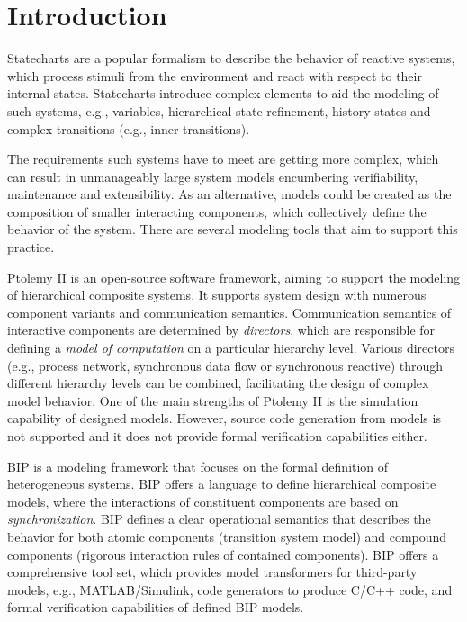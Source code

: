 \documentclass[conference]{IEEEtran}
\newcommand{\Yakindu}{\textsf{Yakindu}}
\begin{document}
\section{Introduction}

Statecharts \cite{Harel:1987:SVF:34884.34886} are a popular formalism to describe the behavior of reactive systems, which process stimuli from the environment and react with respect to their internal states. Statecharts introduce complex elements to aid the modeling of such systems, e.g., variables, hierarchical state refinement, history states and complex transitions (e.g., inner transitions).

%
The requirements such systems have to meet are getting more complex, which can result in unmanageably large system models encumbering verifiability, maintenance and extensibility. As an alternative, models could be created as the composition of smaller interacting components,  which collectively define the behavior of the system. There are several modeling tools that aim to support this practice.


Ptolemy II \cite{ptolemy,ptolemy2} is an open-source software framework, aiming to support
the modeling of hierarchical composite systems. It supports system design with numerous component variants and communication semantics. Communication semantics of interactive components are determined by \emph{directors}, which are responsible for defining a \emph{model of computation} on a particular hierarchy level. Various directors (e.g., process network, synchronous data flow
or synchronous reactive) through different hierarchy levels can be combined, facilitating the design of complex model behavior. One of the main strengths of Ptolemy II is the simulation capability of designed models. However, source code generation from models is not supported and it does not provide formal verification capabilities either.

BIP \cite{bip,bip3} is a modeling framework that focuses on the formal definition of heterogeneous systems.
BIP offers a language to define hierarchical composite models, where the interactions of constituent components are based on \emph{synchronization}. BIP defines a clear operational semantics that describes the behavior for both atomic components (transition system model) and compound components (rigorous interaction rules of contained components). BIP offers a comprehensive tool set, which provides model transformers for third-party models, e.g., MATLAB/Simulink, code generators to produce C/C++ code, and formal
verification capabilities of defined BIP models.
\end{document}
